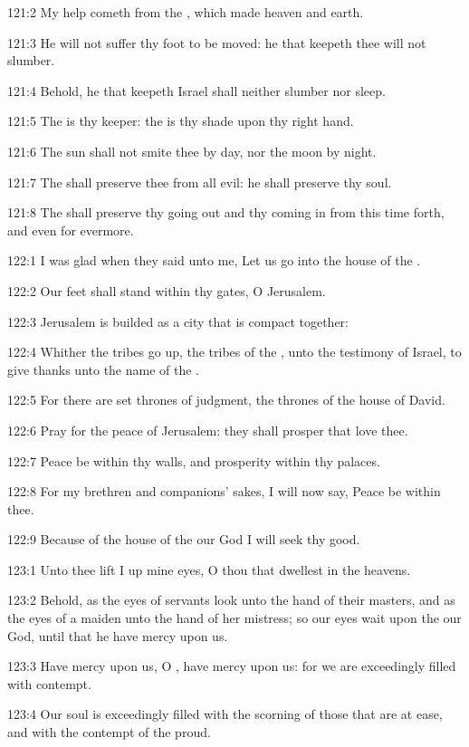 121:2 My help cometh from the \LORD, which made heaven and earth.

121:3 He will not suffer thy foot to be moved: he that keepeth thee
will not slumber.

121:4 Behold, he that keepeth Israel shall neither slumber nor sleep.

121:5 The \LORD is thy keeper: the \LORD is thy shade upon thy right
hand.

121:6 The sun shall not smite thee by day, nor the moon by night.

121:7 The \LORD shall preserve thee from all evil: he shall preserve
thy soul.

121:8 The \LORD shall preserve thy going out and thy coming in from
this time forth, and even for evermore.



122:1 I was glad when they said unto me, Let us go into the house of
the \LORD.

122:2 Our feet shall stand within thy gates, O Jerusalem.

122:3 Jerusalem is builded as a city that is compact together:

122:4 Whither the tribes go up, the tribes of the \LORD, unto the
testimony of Israel, to give thanks unto the name of the \LORD.

122:5 For there are set thrones of judgment, the thrones of the house
of David.

122:6 Pray for the peace of Jerusalem: they shall prosper that love
thee.

122:7 Peace be within thy walls, and prosperity within thy palaces.

122:8 For my brethren and companions' sakes, I will now say, Peace be
within thee.

122:9 Because of the house of the \LORD our God I will seek thy good.



123:1 Unto thee lift I up mine eyes, O thou that dwellest in the
heavens.

123:2 Behold, as the eyes of servants look unto the hand of their
masters, and as the eyes of a maiden unto the hand of her mistress; so
our eyes wait upon the \LORD our God, until that he have mercy upon us.

123:3 Have mercy upon us, O \LORD, have mercy upon us: for we are
exceedingly filled with contempt.

123:4 Our soul is exceedingly filled with the scorning of those that
are at ease, and with the contempt of the proud.



